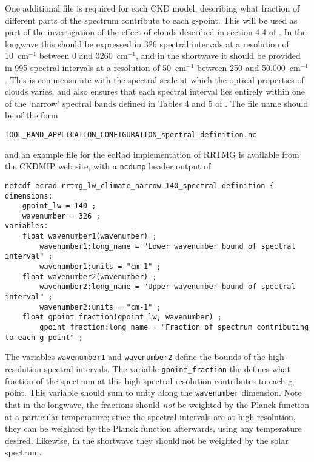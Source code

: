 \documentclass[twoside]{article}
\def\codesize{\small}
\def\code#1{{\codesize\texttt{#1}}}
\begin{document}
One additional file is required for each CKD model, describing what
fraction of different parts of the spectrum contribute to each
g-point. This will be used as part of the investigation of the effect
of clouds described in section 4.4 of \cite{Hogan+2020}.  In the
longwave this should be expressed in 326 spectral intervals at a
resolution of 10~cm$^{-1}$ between 0 and 3260~cm$^{-1}$, and in the
shortwave it should be provided in 995 spectral intervals at a
resolution of 50~cm$^{-1}$ between 250 and 50,000~cm$^{-1}$. This is
commensurate with the spectral scale at which the optical properties
of clouds varies, and also ensures that each spectral interval lies
entirely within one of the `narrow' spectral bands defined in Tables 4
and 5 of \cite{Hogan+2020}. The file name should be of the form
%
\begin{verbatim}
TOOL_BAND_APPLICATION_CONFIGURATION_spectral-definition.nc
\end{verbatim}
%
and an example file for the ecRad implementation of RRTMG is available
from the CKDMIP web site, with a \code{ncdump} header output of:
%
\begin{verbatim}
netcdf ecrad-rrtmg_lw_climate_narrow-140_spectral-definition {
dimensions:
    gpoint_lw = 140 ;
    wavenumber = 326 ;
variables:
    float wavenumber1(wavenumber) ;
        wavenumber1:long_name = "Lower wavenumber bound of spectral interval" ;
        wavenumber1:units = "cm-1" ;
    float wavenumber2(wavenumber) ;
        wavenumber2:long_name = "Upper wavenumber bound of spectral interval" ;
        wavenumber2:units = "cm-1" ;
    float gpoint_fraction(gpoint_lw, wavenumber) ;
        gpoint_fraction:long_name = "Fraction of spectrum contributing to each g-point" ;

\end{verbatim}
%
The variables \code{wavenumber1} and \code{wavenumber2} define the
bounds of the high-resolution spectral intervals.  The variable
\code{gpoint\_fraction} the defines what fraction of the spectrum at
this high spectral resolution contributes to each g-point. This
variable should sum to unity along the \code{wavenumber}
dimension. Note that in the longwave, the fractions should \emph{not}
be weighted by the Planck function at a particular temperature; since
the spectral intervals are at high resolution, they can be weighted by
the Planck function afterwards, using any temperature desired.
Likewise, in the shortwave they should not be weighted by the solar
spectrum.
\end{document}
